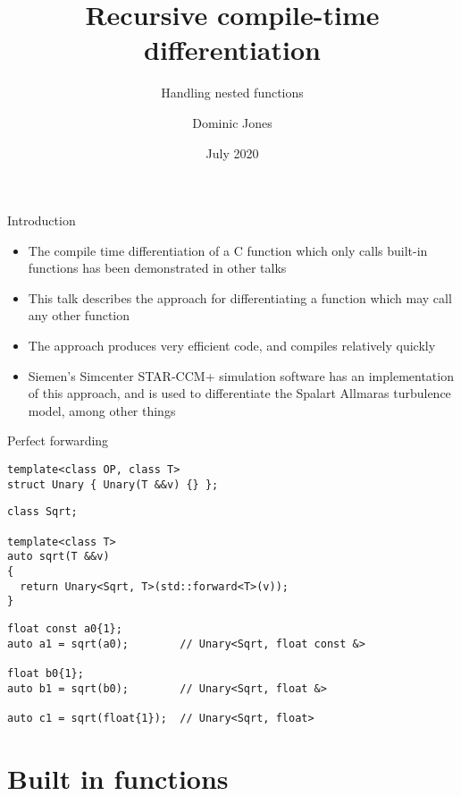 \documentclass[xcolor=dvipsnames]{beamer}
\title{Recursive compile-time differentiation}
\subtitle{Handling nested functions}
\author{Dominic Jones}
\date{\small{July 2020}}
\def\CC{{C\nolinebreak[4]\hspace{-.05em}\raisebox{.4ex}{\small\bf ++}}}
\begin{document}
\begin{frame}[plain]
  \titlepage
\end{frame}


\begin{frame}[fragile]{Introduction}
\begin{itemize}
\item The compile time differentiation of a {\CC} function which only calls built-in functions has been demonstrated in other talks \vspace{3mm}
\item This talk describes the approach for differentiating a function which may call any other function \vspace{3mm}
\item The approach produces very efficient code, and compiles relatively quickly \vspace{3mm}
\item Siemen's Simcenter STAR-CCM+ simulation software has an implementation of this approach, and is used to differentiate the Spalart Allmaras turbulence model, among other things \vspace{3mm}
\end{itemize}
\end{frame}


\begin{frame}[fragile]{Perfect forwarding}
\begin{lstlisting}
template<class OP, class T>
struct Unary { Unary(T &&v) {} };
\end{lstlisting}

\begin{lstlisting}
class Sqrt;

template<class T>
auto sqrt(T &&v)
{
  return Unary<Sqrt, T>(std::forward<T>(v));
}
\end{lstlisting}

\begin{lstlisting}
float const a0{1};
auto a1 = sqrt(a0);        // Unary<Sqrt, float const &>

float b0{1};
auto b1 = sqrt(b0);        // Unary<Sqrt, float &>

auto c1 = sqrt(float{1});  // Unary<Sqrt, float>
\end{lstlisting}
\end{frame}


\section{Built in functions}
\end{document}
